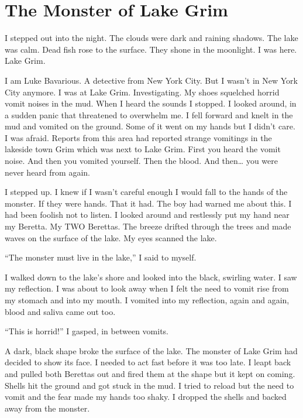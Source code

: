 \chapter{The Monster of Lake Grim}



I stepped out into the night. The clouds were dark and raining
shadows. The lake was calm. Dead fish rose to the surface. They
shone in the moonlight. I was here. Lake Grim.



I am Luke Bavarious. A detective from New York City. But I
wasn't in New York City anymore. I was at Lake Grim.
Investigating. My shoes squelched horrid vomit noises in the mud.
When I heard the sounds I stopped. I looked around, in a sudden
panic that threatened to overwhelm me. I fell forward and knelt in
the mud and vomited on the ground. Some of it went on my hands but
I didn't care. I was afraid. Reports from this area had
reported strange vomitings in the lakeside town Grim which was next
to Lake Grim. First you heard the vomit noise. And then you vomited
yourself. Then the blood. And then{\ldots} you were never heard
from again.



I stepped up. I knew if I wasn't careful enough I would fall
to the hands of the monster. If they were hands. That it had. The
boy had warned me about this. I had been foolish not to listen. I
looked around and restlessly put my hand near my Beretta. My TWO
Berettas. The breeze drifted through the trees and made waves on
the surface of the lake. My eyes scanned the lake.



``The monster must live in the lake,'' I said to
myself.



I walked down to the lake's shore and looked into the black,
swirling water. I saw my reflection. I was about to look away when
I felt the need to vomit rise from my stomach and into my mouth. I
vomited into my reflection, again and again, blood and saliva came
out too.



``This is horrid!'' I gasped, in between vomits.



A dark, black shape broke the surface of the lake. The monster of
Lake Grim had decided to show its face. I needed to act fast before
it was too late. I leapt back and pulled both Berettas out and
fired them at the shape but it kept on coming. Shells hit the
ground and got stuck in the mud. I tried to reload but the need to
vomit and the fear made my hands too shaky. I dropped the shells
and backed away from the monster.



